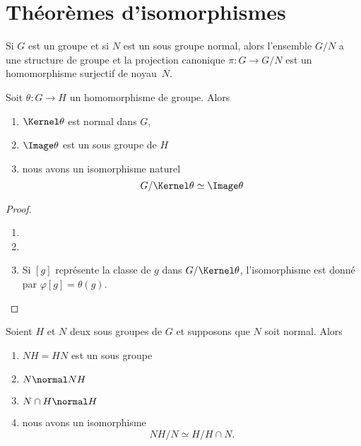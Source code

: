 \section{Théorèmes d'isomorphismes}

Si \( G\) est un groupe et si \( N\) est un sous groupe normal, alors l'ensemble \( G/N\) a une structure de groupe et la projection canonique \( \pi\colon G\to G/N\) est un homomorphisme surjectif de noyau~\( N\).

\begin{theorem}        \label{ThoPremierthoisomo}
    Soit \( \theta\colon G\to H\) un homomorphisme de groupe. Alors
    \begin{enumerate}
        \item
            \( \Kernel\theta\) est normal dans \( G\),
        \item
            \( \Image \theta\) est un sous groupe de \( H\)
        \item
            nous avons un isomorphisme naturel
            \begin{equation}
                G/\Kernel\theta\simeq \Image\theta
            \end{equation}
    \end{enumerate}
\end{theorem}

\begin{proof}
    \begin{enumerate}
        \item
        \item
        \item
            Si \( [g]\) représente la classe de \( g\) dans \( G/\Kernel\theta\), l'isomorphisme est donné par \( \varphi[g]=\theta(g)\).
    \end{enumerate}
\end{proof}


\begin{theorem}
    Soient \( H\) et \( N\) deux sous groupes de \( G\) et supposons que \( N\) soit normal. Alors
    \begin{enumerate}
        \item
            \( NH=HN\) est un sous groupe
        \item
            \( N\normal NH\)
        \item
            \( N\cap H\normal H\)
        \item
            nous avons un isomorphisme
            \begin{equation}
                NH/N\simeq H/H\cap N.
            \end{equation}
    \end{enumerate}
\end{theorem}

